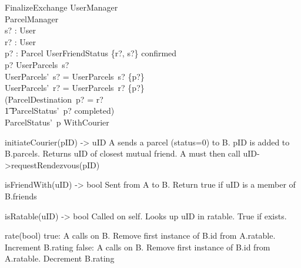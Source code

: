 \documentclass{article}
\begin{document}
\begin{schema}{FinalizeExchange}
	\Delta UserManager\\
	\Delta ParcelManager\\
	s? : User\\
	r? : User\\
	p? : Parcel
	\where
	UserFriendStatus \{r?, s?\} \mapsto confirmed\\
	p? \in UserParcels~s?\\
	UserParcels'~s? = UserParcels~s? \setminus \{p?\}\\
	UserParcels'~r? = UserParcels~r? \cup \{p?\}\\
	(ParcelDestination~p? = r? \\
	\t1 \land ParcelStatus'~p? \mapsto completed)\\
	\lor ParcelStatus'~p \mapsto WithCourier\\
\end{schema}

initiateCourier(pID) -> uID
A sends a parcel (status=0) to B. pID is added to B.parcels. Returns uID of closest mutual friend. A must then call uID->requestRendezvous(pID)

isFriendWith(uID) -> bool
Sent from A to B. Return true if uID is a member of B.friends

isRatable(uID) -> bool
Called on self. Looks up uID in ratable. True if exists.

rate(bool)
true: A calls on B. Remove first instance of B.id from A.ratable. Increment B.rating
false: A calls on B. Remove first instance of B.id from A.ratable. Decrement B.rating
\end{document}

